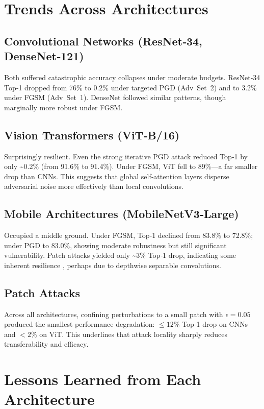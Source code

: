 \documentclass[twoside,11pt]{article}
\begin{document}
\section{Trends Across Architectures}

\subsection{Convolutional Networks (ResNet‑34, DenseNet‑121)}
Both suffered catastrophic accuracy collapses under moderate budgets. ResNet‑34  Top‑1 dropped from 76\% to 0.2\% under targeted PGD (Adv~Set~2) and to 3.2\% under FGSM (Adv~Set~1). DenseNet followed similar patterns, though marginally more robust under FGSM.

\subsection{Vision Transformers (ViT‑B/16)}
Surprisingly resilient. Even the strong iterative PGD attack reduced Top‑1 by only \textasciitilde0.2\% (from 91.6\% to 91.4\%). Under FGSM, ViT fell to 89\%—a far smaller drop than CNNs. This suggests that global self‐attention layers disperse adversarial noise more effectively than local convolutions.

\subsection{Mobile Architectures (MobileNetV3‑Large)}
Occupied a middle ground. Under FGSM, Top‑1 declined from 83.8\% to 72.8\%; under PGD to 83.0\%, showing moderate robustness but still significant vulnerability. Patch attacks yielded only \textasciitilde3\% Top‑1 drop, indicating some inherent resilience \citep{dvornik2021robust}, perhaps due to depthwise separable convolutions.

\subsection{Patch Attacks}
Across all architectures, confining perturbations to a small patch with $\epsilon=0.05$ produced the smallest performance degradation: $\le 12\%$ Top‑1 drop on CNNs and $<2\%$ on ViT. This underlines that attack locality sharply reduces transferability and efficacy.

\section{Lessons Learned from Each Architecture}
\end{document}
